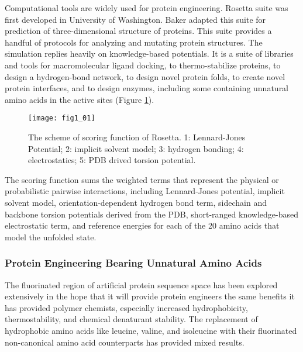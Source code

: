 \begin{refsection}
Computational tools are widely used for protein
engineering\cite{Rothlisberger2008,DiMaio2011a,Korkegian2005,
Leaver-Fay2013a,Leaver-Fay2011,Drew2013a,Kaufmann2010,Rohl2004}.
Rosetta suite was first developed in University of Washington. Baker  adapted this suite for prediction of three-dimensional structure of
proteins\cite{Leaver-Fay2011}. This suite provides a handful of protocols for
analyzing and mutating protein structures.  The simulation replies heavily on
knowledge-based potentials. It is a suite of libraries and tools for
macromolecular ligand docking, to thermo-stabilize proteins, to design a
hydrogen-bond network, to design novel protein folds, to create novel protein
interfaces, and to design enzymes, including some containing unnatural amino
acids in the active sites (Figure \ref{fig:rosetta-intro}).
\begin{figure}[h!] \centering \texttt{[image: fig1\_01]}
    \caption[The scheme of scoring function of Rosetta. 1: Lennard-Jones
    Potential; 2: implicit solvent model; 3: hydrogen bonding; 4:
electrostatics; 5: PDB drived torsion potential.]{The scheme of scoring
    function of Rosetta. 1: Lennard-Jones Potential; 2: implicit solvent model;
3: hydrogen bonding; 4: electrostatics; 5: PDB drived torsion potential.}
\label{fig:rosetta-intro}
\end{figure}
The scoring function sums the weighted terms that represent the physical or
probabilistic pairwise interactions\cite{Rohl2004}, including Lennard-Jones
potential, implicit solvent model\cite{Lazaridis1999}, orientation-dependent
hydrogen bond term\cite{Kortemme2003}, sidechain and backbone torsion
potentials derived from the PDB, short-ranged knowledge-based electrostatic
term, and reference energies for each of the 20 amino acids that model the
unfolded state.

\subsubsection{Protein Engineering Bearing Unnatural Amino Acids}

The fluorinated region of artificial protein sequence space has been explored
extensively in the hope that it will provide protein engineers the same
benefits it has provided polymer chemists, especially increased hydrophobicity,
thermostability, and chemical denaturant stability. The replacement of
hydrophobic amino acids like leucine, valine, and isoleucine with their
fluorinated non-canonical amino acid counterparts has provided mixed results.


\end{refsection}
